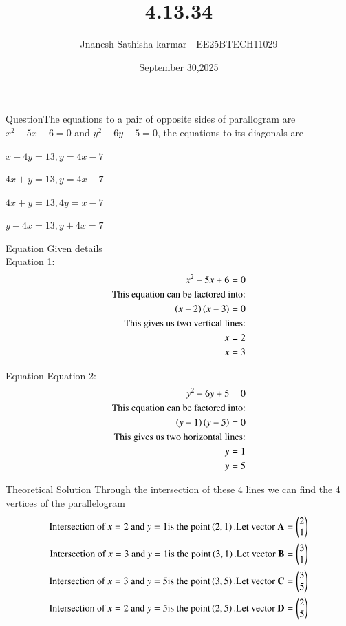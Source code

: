 \documentclass{beamer}
\title %
{4.13.34}
\date{September 30,2025}
\author 
{Jnanesh Sathisha karmar - EE25BTECH11029}
\begin{document}
\frame{\titlepage}
\begin{frame}{Question}The equations to a pair of opposite sides of parallogram are $x^2 - 5x + 6 = 0$ and $y^2 - 6y + 5 = 0$, the equations to its diagonals are
\begin{enumerate}
\begin{multicols}{2}
    \item $x+4y=13,y=4x-7$
    \item $4x+y=13,y=4x-7$
    \item $4x+y=13,4y=x-7$
    \item $y-4x=13,y+4x=7$
\end{multicols}
\end{enumerate}


\end{frame}



\begin{frame}{Equation}
 Given details\\Equation 1:
\begin{align}
   x^2-5x+6=0\\
   \text{This equation can be factored into:}\\
   \left(x-2\right)\left(x-3\right)=0\\
   \text{This gives us two vertical lines:}\\
   x=2\\
   x=3
\end{align}
\end{frame}
\begin{frame}{Equation}
Equation 2:
\begin{align}
    y^2-6y+5=0\\
    \text{This equation can be factored into:}\\
    \left(y-1\right)\left(y-5\right)=0\\
    \text{This gives us two horizontal lines:}\\
    y=1\\
    y=5
\end{align}
\end{frame}
\begin{frame}{Theoretical Solution}
Through the intersection of these 4 lines we can find the 4 vertices of the parallelogram 
\begin{align}
    \text{Intersection of}\  x=2\  \text{and}\  y=1 \text{is the point} \left(2,1\right).\text{Let vector}\ \mathbf{A}=\begin{pmatrix}2\\1\end{pmatrix}\\
    \text{Intersection of}\  x=3\  \text{and}\  y=1 \text{is the point} \left(3,1\right).\text{Let vector}\ \mathbf{B}=\begin{pmatrix}3\\1\end{pmatrix}\\
    \text{Intersection of}\  x=3\  \text{and}\  y=5 \text{is the point} \left(3,5\right).\text{Let vector}\ \mathbf{C}=\begin{pmatrix}3\\5\end{pmatrix}\\
    \text{Intersection of}\  x=2\  \text{and}\  y=5 \text{is the point} \left(2,5\right).\text{Let vector}\ \mathbf{D}=\begin{pmatrix}2\\5\end{pmatrix}\\
\end{align}
\end{frame}
\end{document}
